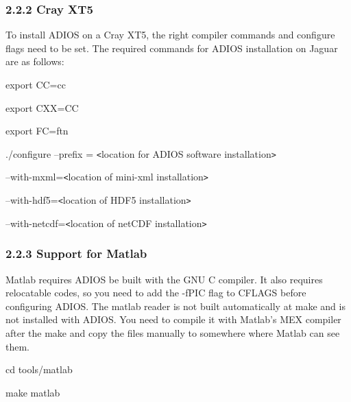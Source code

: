 \vspace{10pt}
\subsubsection*{{\large \textbf{2.2.2 Cray XT5}}}

\vspace{10pt}
To install ADIOS on a Cray XT5, the right compiler commands and configure flags 
need to be set. The required commands for ADIOS installation on Jaguar are as follows:

\vspace{10pt}
export CC=cc

\vspace{10pt}
export CXX=CC

\vspace{10pt}
export FC=ftn

\vspace{10pt}
./configure --prefix = \texttt{<}location for ADIOS software installation\texttt{>}

\vspace{10pt}
\parindent=43pt
--with-mxml=\texttt{<}location of mini-xml installation\texttt{>}

\vspace{10pt}
--with-hdf5=\texttt{<}location of HDF5 installation\texttt{>}

\vspace{10pt}
\parindent=0pt
--with-netcdf=\texttt{<}location of netCDF installation\texttt{>}\label{HToc182553333}

\vspace{22pt}
\subsubsection*{{\large \textbf{2.2.3 Support for Matlab}}}

\vspace{10pt}
Matlab requires ADIOS be built with the GNU C compiler. It also requires relocatable 
codes, so you need to add the -fPIC flag to CFLAGS before configuring ADIOS. The 
matlab reader is not built automatically at make and is not installed with ADIOS. 
You need to compile it with Matlab's MEX compiler after the make and copy the files 
manually to somewhere where Matlab can see them.

\vspace{10pt}
cd tools/matlab

\vspace{10pt}
make matlab\label{HToc84890225}\label{HToc212016600}\label{HToc212016842}\label{HToc182553334}

